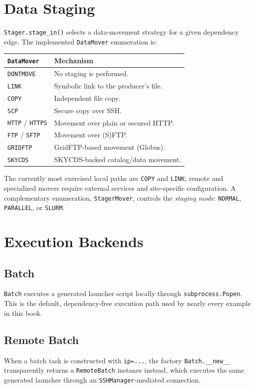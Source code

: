 \section{Data Staging}
\label{sec:data-staging-architecture}

\texttt{Stager.stage\_in()} selects a data-movement strategy for a given
dependency edge. The implemented \texttt{DataMover} enumeration is:

\begin{center}
\begin{tabular}{@{}ll@{}}
\toprule
\textbf{\texttt{DataMover}} & \textbf{Mechanism} \\
\midrule
\texttt{DONTMOVE} & No staging is performed. \\
\texttt{LINK}     & Symbolic link to the producer's file. \\
\texttt{COPY}     & Independent file copy. \\
\texttt{SCP}      & Secure copy over SSH. \\
\texttt{HTTP} / \texttt{HTTPS} & Movement over plain or secured HTTP. \\
\texttt{FTP} / \texttt{SFTP}   & Movement over (S)FTP. \\
\texttt{GRIDFTP}  & GridFTP-based movement (Globus). \\
\texttt{SKYCDS}   & SKYCDS-backed catalog/data movement. \\
\bottomrule
\end{tabular}
\end{center}

The currently most exercised local paths are \texttt{COPY} and \texttt{LINK};
remote and specialized movers require external services and site-specific
configuration. A complementary enumeration, \texttt{StagerMover}, controls
the \emph{staging mode}: \texttt{NORMAL}, \texttt{PARALLEL}, or
\texttt{SLURM}.

\section{Execution Backends}

\subsection{Batch}
\texttt{Batch} executes a generated launcher script locally through
\texttt{subprocess.Popen}. This is the default, dependency-free execution
path used by nearly every example in this book.

\subsection{Remote Batch}
When a batch task is constructed with \texttt{ip=...}, the factory
\texttt{Batch.\_\_new\_\_} transparently returns a \texttt{RemoteBatch}
instance instead, which executes the same generated launcher through an
\texttt{SSHManager}-mediated connection.


